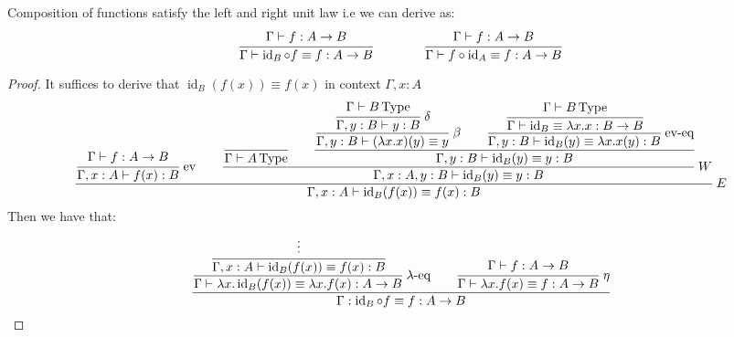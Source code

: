 \begin{lemma}
    Composition of functions satisfy the left and right unit law i.e we can derive as:
    \begin{equation*}
        \cfrac{\Gamma\vdash f:A\rightarrow B}{\Gamma\vdash\operatorname{id}_B\circ f\equiv f:A\rightarrow B} \qquad\qquad \cfrac{\Gamma\vdash f:A\rightarrow B}{\Gamma\vdash f\circ \operatorname{id}_A\equiv f:A\rightarrow B}
    \end{equation*}
\end{lemma}
\begin{dem}
\begin{proof}
    It suffices to derive that $\operatorname{id}_B(f(x))\equiv f(x)$ in context $\Gamma,x:A$ 
    \begin{equation*}
        \cfrac{\cfrac{\Gamma\vdash f:A\rightarrow B}{\Gamma, x:A\vdash f(x):B}\text{ ev}\qquad \cfrac{\cfrac{}{\Gamma\vdash A\type}\qquad \cfrac{\cfrac{\cfrac{\Gamma\vdash B\type}{\Gamma, y:B\vdash y:B}\ \delta}{\Gamma, y:B\vdash(\lambda x.x)(y)\equiv y}\ \beta\qquad\cfrac{\cfrac{\Gamma\vdash B\type }{\Gamma\vdash\operatorname{id}_B\equiv\lambda x.x:B\rightarrow B}}{\Gamma, y:B\vdash \operatorname{id}_B(y)\equiv \lambda x.x(y):B}\text{ ev-eq}}{\Gamma, y:B\vdash \operatorname{id}_B(y)\equiv y:B}}{\Gamma, x:A, y:B\vdash \operatorname{id}_B(y)\equiv y:B}\ W}{\Gamma,x:A\vdash\operatorname{id}_B(f(x))\equiv f(x):B} \ E
    \end{equation*}
    Then we have that:
    \begin{equation*}
        \cfrac{\cfrac{\cfrac{\vdots}{\Gamma,x:A\vdash\operatorname{id}_B(f(x))\equiv f(x):B}}{\Gamma\vdash\lambda x.\operatorname{id}_B(f(x))\equiv\lambda x.f(x):A\to B}\ \lambda\text{-eq}\qquad\cfrac{\Gamma\vdash f:A\to B}{\Gamma\vdash\lambda x.f(x)\equiv f:A\to B}\ \eta}{\Gamma:\operatorname{id}_B\circ f\equiv f:A\rightarrow B}
    \end{equation*}
\end{proof}
\end{dem}

